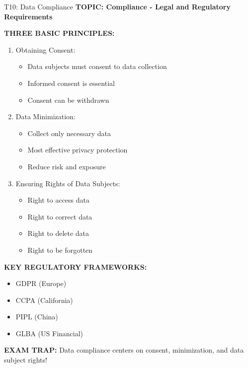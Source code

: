 \documentclass[8pt]{beamer}
\begin{document}
	\begin{frame}{T10: Data Compliance}
		\fontsize{6.5}{7.5}\selectfont
		\textbf{TOPIC: Compliance - Legal and Regulatory Requirements}
		
		\vspace{0.1cm}
		\textbf{THREE BASIC PRINCIPLES:}
		\begin{enumerate}
			\item \textcolor{myblue}{Obtaining Consent:}
			\begin{itemize}
				\item Data subjects must consent to data collection
				\item Informed consent is essential
				\item Consent can be withdrawn
			\end{itemize}
			\item \textcolor{myblue}{Data Minimization:}
			\begin{itemize}
				\item Collect only necessary data
				\item Most effective privacy protection
				\item Reduce risk and exposure
			\end{itemize}
			\item \textcolor{myblue}{Ensuring Rights of Data Subjects:}
			\begin{itemize}
				\item Right to access data
				\item Right to correct data
				\item Right to delete data
				\item Right to be forgotten
			\end{itemize}
		\end{enumerate}
		
		\vspace{0.1cm}
		\textbf{KEY REGULATORY FRAMEWORKS:}
		\begin{itemize}
			\item GDPR (Europe)
			\item CCPA (California)
			\item PIPL (China)
			\item GLBA (US Financial)
		\end{itemize}
		
		\textcolor{myred}{\textbf{EXAM TRAP:}} Data compliance centers on \textcolor{myblue}{consent, minimization, and data subject rights}!
	\end{frame}
	
\end{document}
